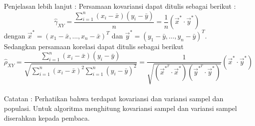 \documentclass[
]{book}
\newenvironment{Shaded}{\begin{snugshade}}{\end{snugshade}}
\newcommand{\AttributeTok}[1]{\textcolor[rgb]{0.13,0.29,0.53}{#1}}
\newcommand{\DecValTok}[1]{\textcolor[rgb]{0.00,0.00,0.81}{#1}}
\newcommand{\FunctionTok}[1]{\textcolor[rgb]{0.13,0.29,0.53}{\textbf{#1}}}
\newcommand{\NormalTok}[1]{#1}
\newcommand{\OtherTok}[1]{\textcolor[rgb]{0.56,0.35,0.01}{#1}}
\newcommand{\SpecialCharTok}[1]{\textcolor[rgb]{0.81,0.36,0.00}{\textbf{#1}}}
\newcommand{\StringTok}[1]{\textcolor[rgb]{0.31,0.60,0.02}{#1}}
\begin{document}
\begin{Shaded}
\end{Shaded}

Penjelasan lebih lanjut :
Persamaan kovariansi dapat ditulis sebagai berikut :
\begin{equation}
\hat{\gamma}_{XY} = \frac{\sum_{i=1}^n (x_i - \bar{x})(y_i - \bar{y})}{n} = \frac{1}{n}(\vec{x}^* \cdot \vec{y}^*) 
\end{equation}
dengan \(\vec{x}^* = (x_1 - \bar{x}, \dots, x_n - \bar{x})^T\) dan \(\vec{y}^* = (y_1 - \bar{y}, \dots, y_n - \bar{y})^T\).\\
Sedangkan persamaan korelasi dapat ditulis sebagai berikut
\begin{equation}
\hat{\rho}_{XY} = \frac{\sum_{i=1}^n (x_i - \bar{x})(y_i - \bar{y})}{\sqrt{\sum_{i=1}^n (x_i - \bar{x})^2\sum_{i=1}^n(y_i - \bar{y})^2}} = \frac{1}{\sqrt{(\vec{x}^{*^T}\cdot \vec{x}^*)(\vec{y}^{*^T}\cdot \vec{y}^{*})}}(\vec{x}^* \cdot \vec{y}^*) 
\end{equation}\\
Catatan :
Perhatikan bahwa terdapat kovariansi dan variansi sampel dan populasi. Untuk algoritma menghitung kovariansi sampel dan variansi sampel diserahkan kepada pembaca.
\end{document}
